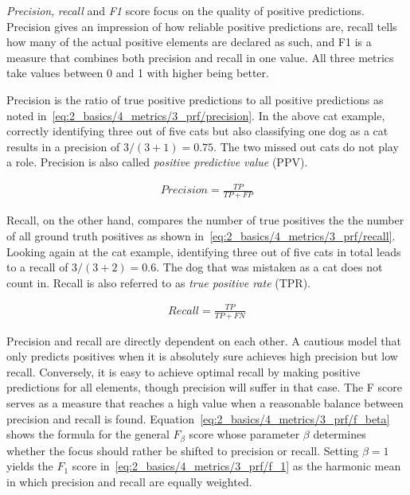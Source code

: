 \emph{Precision}, \emph{recall} and \emph{F1} score focus on the quality of positive predictions. Precision gives an impression of how reliable positive predictions are, recall tells how many of the actual positive elements are declared as such, and F1 is a measure that combines both precision and recall in one value. All three metrics take values between 0 and 1 with higher being better.

Precision is the ratio of true positive predictions to all positive predictions as noted in~\ref{eq:2_basics/4_metrics/3_prf/precision}. In the above cat example, correctly identifying three out of five cats but also classifying one dog as a cat results in a precision of $3 / (3 + 1) = 0.75$. The two missed out cats do not play a role. Precision is also called \emph{positive predictive value} (PPV).

\begin{align}
    Precision = \frac{TP}{TP + FP}
    \label{eq:2_basics/4_metrics/3_prf/precision}
\end{align}

Recall, on the other hand, compares the number of true positives the the number of all ground truth positives as shown in~\ref{eq:2_basics/4_metrics/3_prf/recall}. Looking again at the cat example, identifying three out of five cats in total leads to a recall of $3 / (3 + 2) = 0.6$. The dog that was mistaken as a cat does not count in. Recall is also referred to as \emph{true positive rate} (TPR).

\begin{align}
    Recall = \frac{TP}{TP + FN}
    \label{eq:2_basics/4_metrics/3_prf/recall}
\end{align}

Precision and recall are directly dependent on each other. A cautious model that only predicts positives when it is absolutely sure achieves high precision but low recall. Conversely, it is easy to achieve optimal recall by making positive predictions for all elements, though precision will suffer in that case. The F score serves as a measure that reaches a high value when a reasonable balance between precision and recall is found. Equation~\ref{eq:2_basics/4_metrics/3_prf/f_beta} shows the formula for the general $F_\beta$ score whose parameter $\beta$ determines whether the focus should rather be shifted to precision or recall. Setting $\beta = 1$ yields the $F_1$ score in~\ref{eq:2_basics/4_metrics/3_prf/f_1} as the harmonic mean in which precision and recall are equally weighted.

